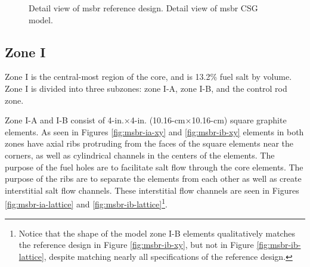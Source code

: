 \begin{figure}[htpb]
    \centering
    \caption[Detail views of MSBR core region]{
         Detail view of \Gls{msbr} reference design.
         Detail view of \Gls{msbr} CSG model.}

    \label{fig:msbr-detail}
\end{figure}

\subsection{Zone I} Zone I is the central-most region of the core, and is 13.2\%
fuel salt by volume. Zone I is divided into three subzones: zone I-A, zone I-B,
and the control rod zone.

Zone I-A and I-B consist of 4-in.$\times$4-in. (10.16-cm$\times$10.16-cm)
square graphite elements. As seen in Figures \ref{fig:msbr-ia-xy} and
\ref{fig:msbr-ib-xy} elements in both zones have axial ribs protruding from
the faces of the square elements near the corners, as well as cylindrical
channels in the centers of the elements. The purpose of the fuel holes are to
facilitate salt flow through the core elements. The purpose of the ribs are to
separate the elements from each other as well as create interstitial salt flow
channels\cite{robertson_conceptual_1971}. These interstitial flow channels
are seen in Figures \ref{fig:msbr-ia-lattice} and
\ref{fig:msbr-ib-lattice}\footnote{Notice that the shape of the model zone I-B
elements qualitatively matches the reference design in Figure
\ref{fig:msbr-ib-xy}, but  not in Figure \ref{fig:msbr-ib-lattice}, despite
matching nearly all specifications of the reference design.}.

